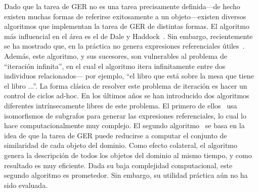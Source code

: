 Dado que la tarea de GER no es una tarea precisamente definida---de hecho existen muchas formas de referirse exitosamente a un objeto---existen diversos algoritmos que implementan la tarea de GER de distintas formas. El algoritmo m\'as influencial en el \'area es el de Dale y Haddock~\cite{DaleRobertandHaddock1991}. Sin embargo, recientemente se ha mostrado que, en la pr\'actica no genera expresiones referenciales \'utiles~\cite{Dale2009}. Adem\'as, este algoritmo, y sus sucesores, son vulnerables al problema de ``iteraci\'on infinita'', en el cual el algoritmo itera infinitamente entre dos individuos relacionados--- por ejemplo, ``el libro que est\'a sobre la mesa que tiene el libro ...''.  La forma cl\'asica de resolver este problema de iteraci\'on es hacer un control de ciclos ad-hoc. En los \'ultimos a\~nos se han introducido dos algoritmos diferentes intr\'insecamente libres de este problema. El primero de ellos~\cite{Krahmer2003} usa isomorfismos de subgrafos para generar las expresiones referenciales, lo cual lo hace computacionalmente muy complejo. El segundo algoritmo~\cite{Areces2008} se basa en la idea de que la tarea de GER puede reducirse a computar el conjunto de similaridad de cada objeto del dominio. Como efecto colateral, el algoritmo genera la descripci\'on de todos los objetos del dominio al mismo tiempo, y como resultado es muy eficiente. Dada su baja complejidad computacional, este segundo algoritmo es prometedor. Sin embargo, su utilidad pr\'actica a\'un no ha sido evaluada.  


   




 

